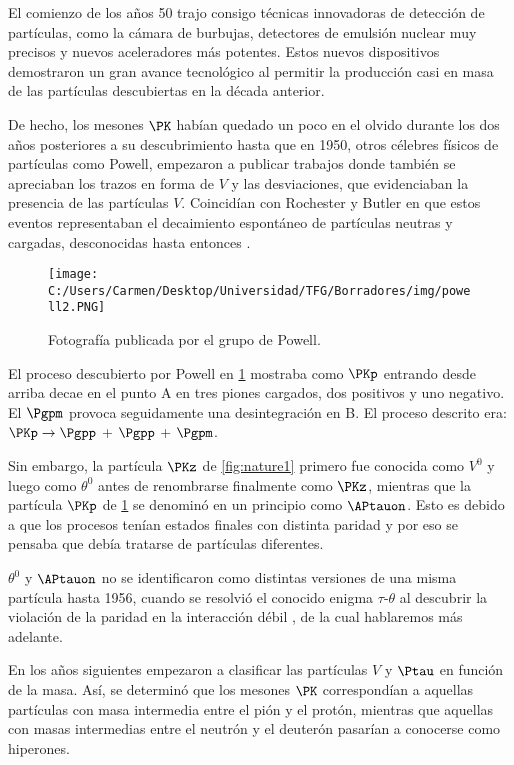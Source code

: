 El comienzo de los años 50 trajo consigo técnicas innovadoras de detección de partículas, como la cámara de burbujas, detectores de emulsión nuclear muy precisos y nuevos aceleradores más potentes. Estos nuevos dispositivos demostraron un gran avance tecnológico al permitir la producción casi en masa de las partículas descubiertas en la década anterior. 

De hecho, los mesones $\PK$ habían quedado un poco en el olvido durante los dos años posteriores a su descubrimiento hasta que en 1950, otros célebres físicos de partículas como Powell, empezaron a publicar trabajos donde también se apreciaban los trazos en forma de $V$ y las desviaciones, que evidenciaban la presencia de las partículas $V$. Coincidían con Rochester y Butler en que estos eventos representaban el decaimiento espontáneo de partículas neutras y cargadas, desconocidas hasta entonces \cite{Pais}. 

\begin{figure}[h!]
	\centering
	\texttt{[image: C:/Users/Carmen/Desktop/Universidad/TFG/Borradores/img/powell2.PNG]}
	\caption[Fotografía de Powell mostrando una trayectoria ``kink'']
	{Fotografía publicada por el grupo de Powell. \cite{Griffiths2008}}
	\label{fig:powell}
\end{figure}

El proceso descubierto por Powell en \ref{fig:powell} mostraba como $\PKp$ entrando desde arriba decae en el punto A en tres piones cargados, dos positivos y uno negativo. El $\Pgpm$ provoca seguidamente una desintegración en B. El proceso descrito era: $\PKp \rightarrow \Pgpp$ + $\Pgpp$ +  $\Pgpm$.

Sin embargo, la partícula $\PKz$ de \ref{fig:nature1} primero fue conocida como $V^0$ y luego como $\theta^0$ antes de renombrarse finalmente como $\PKz$, mientras que la partícula $\PKp$ de \ref{fig:powell} se denominó en un principio como $\APtauon$. Esto es debido a que los procesos tenían estados finales con distinta paridad y por eso se pensaba que debía tratarse de partículas diferentes.

$\theta^0$ y $\APtauon$ no se identificaron como distintas versiones de una misma partícula hasta 1956, cuando se resolvió el conocido enigma $\tau$-$\theta$ al descubrir la violación de la paridad en la interacción débil \cite{Lee}, de la cual hablaremos más adelante. 

En los años siguientes empezaron a clasificar las partículas $V$ y $\Ptau$ en función de la masa. Así, se determinó que los mesones $\PK$ correspondían a aquellas partículas con masa intermedia entre el pión y el protón, mientras que aquellas con masas intermedias entre el neutrón y el deuterón pasarían a conocerse como hiperones. 

